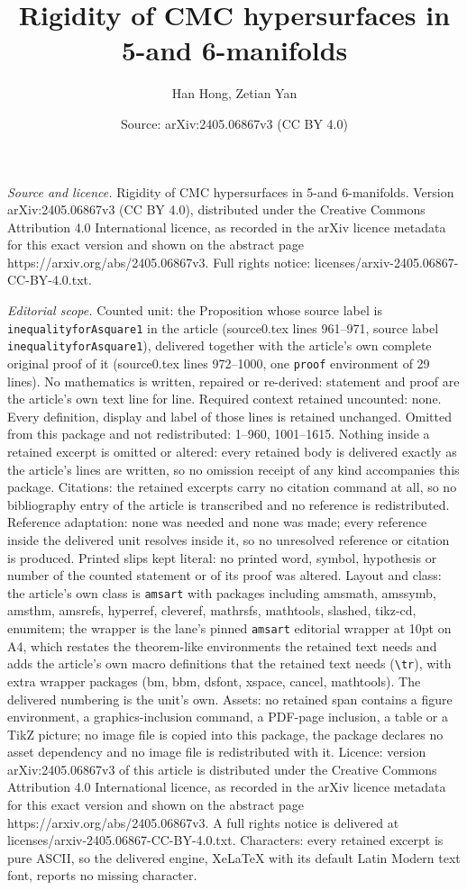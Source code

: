 \documentclass[10pt,a4paper]{amsart}
\title[Rigidity of CMC hypersurfaces in 5-and 6-manifolds]{Rigidity of CMC hypersurfaces in 5-and 6-manifolds}
\author{Han Hong, Zetian Yan}
\date{Source: arXiv:2405.06867v3 (CC BY 4.0)}
\begin{document}
\maketitle

\noindent\emph{Source and licence.} Rigidity of CMC hypersurfaces in 5-and 6-manifolds. Version arXiv:2405.06867v3 (CC BY 4.0), distributed under the Creative Commons Attribution 4.0 International licence, as recorded in the arXiv licence metadata for this exact version and shown on the abstract page https://arxiv.org/abs/2405.06867v3. Full rights notice: licenses/arxiv-2405.06867-CC-BY-4.0.txt.\par\smallskip

\noindent\textit{Editorial scope.} Counted unit: the Proposition whose source label is \texttt{inequalityforAsquare1} in the article (source0.tex lines 961--971, source label \texttt{inequalityforAsquare1}), delivered together with the article's own complete original proof of it (source0.tex lines 972--1000, one \texttt{proof} environment of 29 lines). No mathematics is written, repaired or re-derived: statement and proof are the article's own text line for line. Required context retained uncounted: none. Every definition, display and label of those lines is retained unchanged. Omitted from this package and not redistributed: 1--960, 1001--1615. Nothing inside a retained excerpt is omitted or altered: every retained body is delivered exactly as the article's lines are written, so no omission receipt of any kind accompanies this package. Citations: the retained excerpts carry no citation command at all, so no bibliography entry of the article is transcribed and no reference is redistributed. Reference adaptation: none was needed and none was made; every reference inside the delivered unit resolves inside it, so no unresolved reference or citation is produced. Printed slips kept literal: no printed word, symbol, hypothesis or number of the counted statement or of its proof was altered. Layout and class: the article's own class is \texttt{amsart} with packages including amsmath, amssymb, amsthm, amsrefs, hyperref, cleveref, mathrsfs, mathtools, slashed, tikz-cd, enumitem; the wrapper is the lane's pinned \texttt{amsart} editorial wrapper at 10pt on A4, which restates the theorem-like environments the retained text needs and adds the article's own macro definitions that the retained text needs (\texttt{\textbackslash tr}), with extra wrapper packages (bm, bbm, dsfont, xspace, cancel, mathtools). The delivered numbering is the unit's own. Assets: no retained span contains a figure environment, a graphics-inclusion command, a PDF-page inclusion, a table or a TikZ picture; no image file is copied into this package, the package declares no asset dependency and no image file is redistributed with it. Licence: version arXiv:2405.06867v3 of this article is distributed under the Creative Commons Attribution 4.0 International licence, as recorded in the arXiv licence metadata for this exact version and shown on the abstract page https://arxiv.org/abs/2405.06867v3. A full rights notice is delivered at licenses/arxiv-2405.06867-CC-BY-4.0.txt. Characters: every retained excerpt is pure ASCII, so the delivered engine, XeLaTeX with its default Latin Modern text font, reports no missing character.
\end{document}
